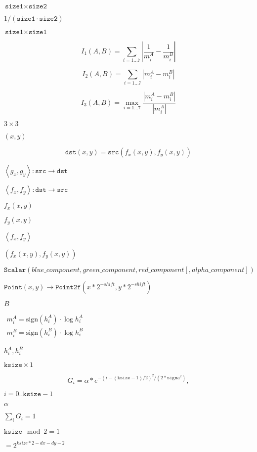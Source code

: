 \documentclass{article}
\begin{document}
$\texttt{size1}\times\texttt{size2}$
\pagebreak

$1/(\texttt{size1}\cdot\texttt{size2})$
\pagebreak

$\texttt{size1}\times\texttt{size1}$
\pagebreak

\[I_1(A,B) = \sum _{i=1...7} \left | \frac{1}{m^A_i} - \frac{1}{m^B_i} \right |\]
\pagebreak

\[I_2(A,B) = \sum _{i=1...7} \left | m^A_i - m^B_i \right |\]
\pagebreak

\[I_3(A,B) = \max _{i=1...7} \frac{ \left| m^A_i - m^B_i \right| }{ \left| m^A_i \right| }\]
\pagebreak

$3 \times 3$
\pagebreak

$(x, y)$
\pagebreak

\[\texttt{dst} (x,y)= \texttt{src} (f_x(x,y), f_y(x,y))\]
\pagebreak

$\left<g_x, g_y\right>: \texttt{src} \rightarrow \texttt{dst}$
\pagebreak

$\left<f_x, f_y\right>: \texttt{dst} \rightarrow \texttt{src}$
\pagebreak

$f_x(x,y)$
\pagebreak

$f_y(x,y)$
\pagebreak

$\left<f_x, f_y\right>$
\pagebreak

$(f_x(x,y), f_y(x,y))$
\pagebreak

\[\texttt{Scalar} (blue \_ component, green \_ component, red \_ component[, alpha \_ component])\]
\pagebreak

$\texttt{Point}(x,y)\rightarrow\texttt{Point2f}(x*2^{-shift},y*2^{-shift})$
\pagebreak

$B$
\pagebreak

$\begin{array}{l} m^A_i = \mathrm{sign} (h^A_i) \cdot \log{h^A_i} \\ m^B_i = \mathrm{sign} (h^B_i) \cdot \log{h^B_i} \end{array}$
\pagebreak

$h^A_i, h^B_i$
\pagebreak

$\texttt{ksize} \times 1$
\pagebreak

\[G_i= \alpha *e^{-(i-( \texttt{ksize} -1)/2)^2/(2* \texttt{sigma}^2)},\]
\pagebreak

$i=0..\texttt{ksize}-1$
\pagebreak

$\alpha$
\pagebreak

$\sum_i G_i=1$
\pagebreak

$\texttt{ksize} \mod 2 = 1$
\pagebreak

$=2^{ksize*2-dx-dy-2}$
\pagebreak
\end{document}
